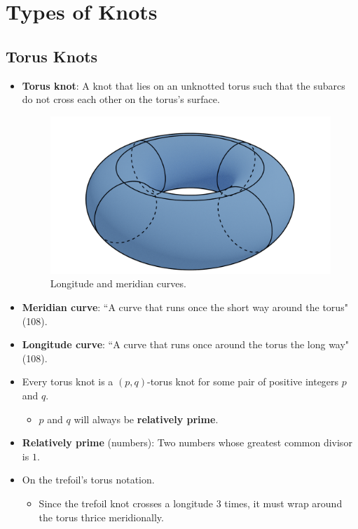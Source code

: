 \documentclass[titlepage]{article}
\numberwithin{figure}{section}
\numberwithin{table}{section}
\numberwithin{equation}{section}
\newcommand{\dq}[2]{``#1" (#2).}
\begin{document}
\section{Types of Knots}
\subsection{Torus Knots}\label{sss:TorusKnots}
\begin{itemize}
    \item \textbf{Torus knot}: A knot that lies on an unknotted torus such that the subarcs do not cross each other on the torus's surface.
    \begin{figure}[h!]
        \centering
        \includegraphics[width=0.3\linewidth]{Blender/Long-merid.png}
        \caption{Longitude and meridian curves.}
        \label{fig:longmerid}
    \end{figure}
    \item \textbf{Meridian curve}: \dq{A curve that runs once the short way around the torus}{108}
    \item \textbf{Longitude curve}: \dq{A curve that runs once around the torus the long way}{108}
    \item Every torus knot is a $(p,q)$-torus knot for some pair of positive integers $p$ and $q$.
    \begin{itemize}
        \item $p$ and $q$ will always be \textbf{relatively prime}.
    \end{itemize}
    \item \textbf{Relatively prime} (numbers): Two numbers whose greatest common divisor is $1$.
    \item On the trefoil's torus notation.
    \begin{itemize}
        \item Since the trefoil knot crosses a longitude 3 times, it must wrap around the torus thrice meridionally.

\end{itemize}
\end{itemize}
\end{document}

